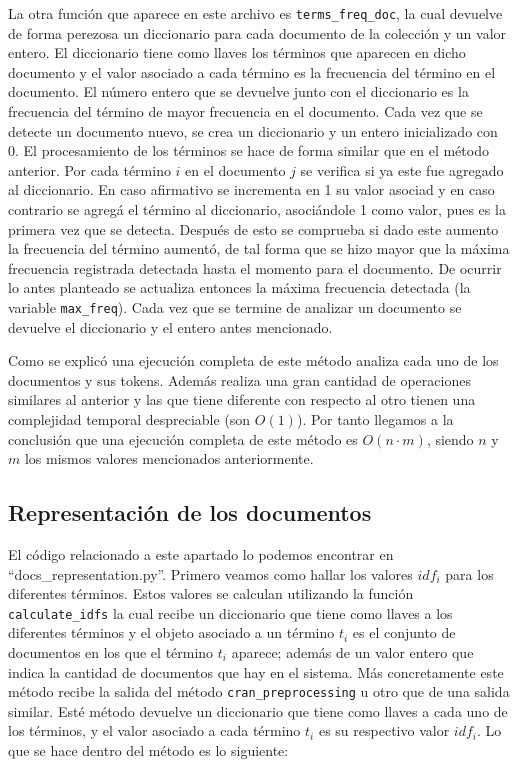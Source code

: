 \documentclass[runningheads]{llncs}
\begin{document}
	La otra funci\'on que aparece en este archivo es \verb|terms_freq_doc|, la cual devuelve de forma perezosa un diccionario para cada documento de la colecci\'on y un valor entero. El diccionario tiene como llaves los t\'erminos que aparecen en dicho documento y el valor asociado a cada t\'ermino es la frecuencia del t\'ermino en el documento. El n\'umero entero que se devuelve junto con el diccionario es la frecuencia del t\'ermino de mayor frecuencia en el documento. Cada vez que se detecte un documento nuevo, se crea un diccionario y un entero inicializado con 0. El procesamiento de los t\'erminos se hace de forma similar que en el m\'etodo anterior. Por cada t\'ermino $i$ en el documento $j$ se verifica si ya este fue agregado al diccionario. En caso afirmativo se incrementa en 1 su valor asociad y en caso contrario se agreg\'a el t\'ermino al diccionario, asoci\'andole 1 como valor, pues es la primera vez que se detecta. Despu\'es de esto se comprueba si dado este aumento la frecuencia del t\'ermino aument\'o, de tal forma que se hizo mayor que la m\'axima frecuencia registrada detectada hasta el momento para el documento. De ocurrir lo antes planteado se actualiza entonces la m\'axima frecuencia detectada (la variable \verb|max_freq|). Cada vez que se termine de analizar un documento se devuelve el diccionario y el entero antes mencionado.
	
	Como se explic\'o una ejecuci\'on completa de este m\'etodo analiza cada uno de los documentos y sus tokens. Adem\'as realiza una gran cantidad de operaciones similares al anterior y las que tiene diferente con respecto al otro tienen una complejidad temporal despreciable (son $O(1)$). Por tanto llegamos a la conclusi\'on que una ejecuci\'on completa de este m\'etodo es $O(n\cdot m)$, siendo $n$ y $m$ los mismos valores mencionados anteriormente.
	
	\subsection{Representaci\'on de los documentos}
	
	El c\'odigo relacionado a este apartado lo podemos encontrar en ``docs\_representation.py''. Primero veamos como hallar los valores $idf_i$ para los diferentes t\'erminos. Estos valores se calculan utilizando la funci\'on \verb|calculate_idfs| la cual recibe un diccionario que tiene como llaves a los diferentes t\'erminos y el objeto asociado a un t\'ermino $t_i$ es el conjunto de documentos en los que el t\'ermino $t_i$ aparece; adem\'as de un valor entero que indica la cantidad de documentos que hay en el sistema. M\'as concretamente este m\'etodo recibe la salida del m\'etodo \verb|cran_preprocessing| u otro que de una salida similar. Est\'e m\'etodo devuelve un diccionario que tiene como llaves a cada uno de los t\'erminos, y el valor asociado a cada t\'ermino $t_i$ es su respectivo valor $idf_i$. Lo que se hace dentro del m\'etodo es lo siguiente: 
\end{document}
